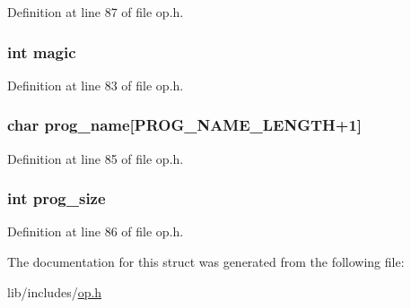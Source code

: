 Definition at line 87 of file op.\-h.

\hypertarget{structheader__s_a6480f97b5704e0c84200f69c08d46870}{
\subsubsection[{magic}]{\setlength{\rightskip}{0pt plus 5cm}int magic}}\label{structheader__s_a6480f97b5704e0c84200f69c08d46870}


Definition at line 83 of file op.\-h.

\hypertarget{structheader__s_a397ee88e66607c854d21ac8cf34490db}{
\subsubsection[{prog\-\_\-name}]{\setlength{\rightskip}{0pt plus 5cm}char prog\-\_\-name\mbox{[}{\bf P\-R\-O\-G\-\_\-\-N\-A\-M\-E\-\_\-\-L\-E\-N\-G\-T\-H}+1\mbox{]}}}\label{structheader__s_a397ee88e66607c854d21ac8cf34490db}


Definition at line 85 of file op.\-h.

\hypertarget{structheader__s_ad2581b30c4292bde684ada555e8c23ce}{
\subsubsection[{prog\-\_\-size}]{\setlength{\rightskip}{0pt plus 5cm}int prog\-\_\-size}}\label{structheader__s_ad2581b30c4292bde684ada555e8c23ce}


Definition at line 86 of file op.\-h.



The documentation for this struct was generated from the following file\-:\begin{DoxyCompactItemize}
\item 
lib/includes/\hyperlink{op_8h}{op.\-h}\end{DoxyCompactItemize}
